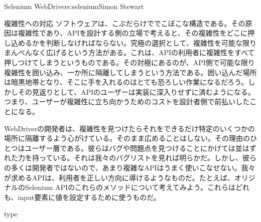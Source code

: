 \begin{aosachapter}{Selenium WebDriver}{s:selenium}{Simon Stewart}
\begin{aosasect1}{複雑性への対応}
ソフトウェアは、こぶだらけででこぼこな構造である。その原因は複雑性であり、APIを設計する側の立場で考えると、その複雑性をどこに押し込めるかを判断しなければならない。究極の選択として、複雑性を可能な限りまんべんなく広げるという方法がある。これは、APIの利用者に複雑性をすべて押しつけてしまうというものである。その対極にあるのが、API側で可能な限り複雑性を囲い込み、一か所に隔離してしまうという方法である。囲い込んだ場所は暗黒地帯となり、そこに手を入れるのはとても恐ろしい作業になるだろう。しかしその見返りとして、APIのユーザーは実装に深入りせずに済むようになる。つまり、ユーザーが複雑性に立ち向かうためのコストを設計者側で前払いしたことになる。

WebDriverの開発者は、複雑性を見つけたらそれをできるだけ特定のいくつかの場所に隔離するよう心がけている。そのまま広めることはしない。その理由のひとつはユーザー層である。彼らはバグや問題点を見つけることにかけては並はずれた力を持っている。それは我々のバグリストを見れば明らかだ。しかし、彼らの多くは開発者ではないので、あまり複雑なAPIはうまく使いこなせない。我々が求めるAPIは、利用者を正しい方向に導けるようなものだ。たとえば、オリジナルのSelenium APIのこれらのメソッドについて考えてみよう。これらはどれも、input要素に値を設定するために使うものだ。

\begin{aosaitemize}

\item type


\end{aosaitemize}
\end{aosasect1}
\end{aosachapter}
